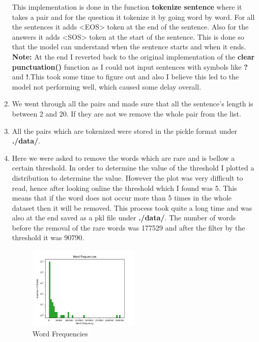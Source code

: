 \documentclass[a4paper]{article}
\begin{document}
\begin{enumerate}
          This implementation is done in the function \textbf{tokenize sentence} where it takes a pair and for the question it tokenize it by going word by word. For all the sentences it adds <EOS> token at the end of the sentence. Also for the answers it adds <SOS> token at the start of the sentence. This is done so that the model can understand when the sentence starts and when it ends.
          \\
          \textbf{Note:} At the end I reverted back to the original implementation of the \textbf{clear punctuation()} function as I could not input sentences with symbols like \textbf{?} and \textbf{!}.This took some time to figure out and also I believe this led to the model not performing well, which caused some delay overall.
    \item We went through all the pairs and made sure that all the sentence's length is between 2 and 20. If they are not we remove the whole pair from the list.
    \item All the pairs which are tokenized were stored in the pickle format under \textbf{./data/}.
    \item Here we were asked to remove the words which are rare and is bellow a certain threshold. In order to determine the value of the threshold I plotted a distribution to determine the value. However the plot was very difficult to read, hence after looking online the threshold which I found was 5. This means that if the word does not occur more than 5 times in the whole dataset then it will be removed. This process took quite a long time and was also at the end saved as a pkl file under \textbf{./data/}. The number of words before the removal of the rare words was 177529 and after the filter by the threshold it was 90790.

          \begin{figure}[H]
              \centering
              \includegraphics[width=0.5\textwidth]{"../data/word_frequencies.png"}
              \caption{Word Frequencies}
              \label{fig:my_label}
          \end{figure}


\end{enumerate}
\end{document}
